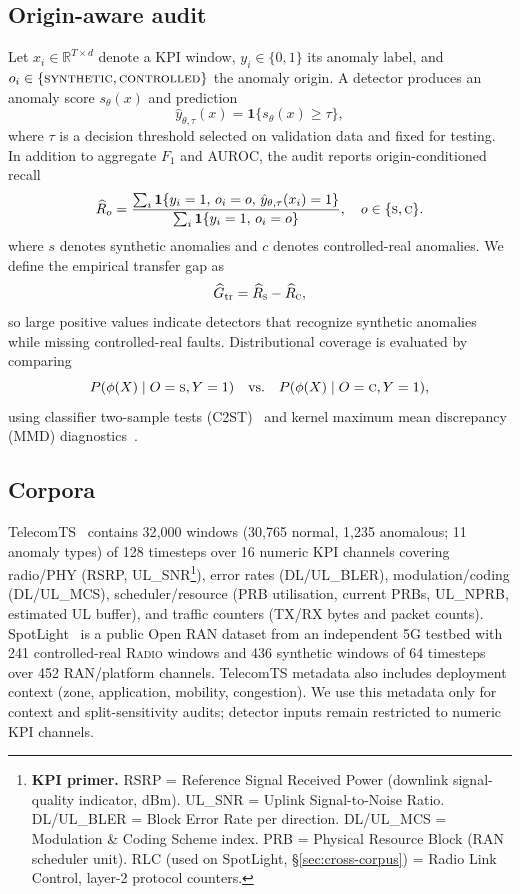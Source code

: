 \documentclass[sigconf,review]{acmart}
\begin{document}
\subsection{Origin-aware audit}
Let $x_i\in\mathbb{R}^{T\times d}$ denote a KPI window, $y_i\in\{0,1\}$ its anomaly label, and $o_i\in\{\textsc{synthetic},\textsc{controlled}\}$ the anomaly origin. A detector produces an anomaly score $s_\theta(x)$ and prediction
\[
\hat y_{\theta,\tau}(x)=\mathbf{1}\{s_\theta(x)\ge\tau\},
\]
where $\tau$ is a decision threshold selected on validation data and fixed for testing. In addition to aggregate $F_1$ and AUROC, the audit reports origin-conditioned recall
\[
\widehat R_o=
\frac{\sum_i \mathbf{1}\{y_i=1,\,o_i=o,\,\hat y_{\theta,\tau}(x_i)=1\}}
{\sum_i \mathbf{1}\{y_i=1,\,o_i=o\}},
\quad
o\in\{\textsc{s},\textsc{c}\}.
\]
where $s$ denotes synthetic anomalies and $c$ denotes controlled-real anomalies.
We define the empirical transfer gap as
\[
\widehat G_{\mathrm{tr}}
=
\widehat R_{\textsc{s}}
-
\widehat R_{\textsc{c}},
\]
so large positive values indicate detectors that recognize synthetic anomalies while missing controlled-real faults. Distributional coverage is evaluated by comparing
\[
P(\phi(X)\mid O=\textsc{s},Y=1)
\quad \text{vs.} \quad
P(\phi(X)\mid O=\textsc{c},Y=1),
\]
using classifier two-sample tests (C2ST)~\citep{lopezpaz2017c2st} and kernel maximum mean discrepancy (MMD) diagnostics~\citep{gretton2012mmd}.

\subsection{Corpora}
TelecomTS~\citep{feng2025telecomts} contains 32{,}000 windows (30{,}765 normal, 1{,}235 anomalous; 11 anomaly types) of 128 timesteps over 16 numeric KPI channels covering radio/PHY (RSRP, UL\_SNR\footnote{\textbf{KPI primer.} RSRP = Reference Signal Received Power (downlink signal-quality indicator, dBm). UL\_SNR = Uplink Signal-to-Noise Ratio. DL/UL\_BLER = Block Error Rate per direction. DL/UL\_MCS = Modulation \& Coding Scheme index. PRB = Physical Resource Block (RAN scheduler unit). RLC (used on SpotLight, \S\ref{sec:cross-corpus}) = Radio Link Control, layer-2 protocol counters.}), error rates (DL/UL\_BLER), modulation/coding (DL/UL\_MCS), scheduler/resource (PRB utilisation, current PRBs, UL\_NPRB, estimated UL buffer), and traffic counters (TX/RX bytes and packet counts). SpotLight~\citep{sun2024spotlight} is a public Open RAN dataset from an independent 5G testbed with 241 controlled-real \textsc{Radio} windows and 436 synthetic windows of 64 timesteps over 452 RAN/platform channels. TelecomTS metadata also includes deployment context (zone, application, mobility, congestion). We use this metadata only for context and split-sensitivity audits; detector inputs remain restricted to numeric KPI channels. 
\end{document}
